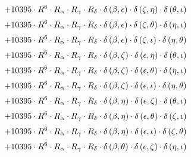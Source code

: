\begin{subequations}
\begin{gather}
 \\[0.2em] \notag 		 + 10395 \cdot R^{6} \cdot R_{\alpha{}} \cdot R_{\gamma{}} \cdot R_{\delta{}} \cdot \delta{}\left(\beta{}, \epsilon{}\right) \cdot \delta{}\left(\zeta{}, \eta{}\right) \cdot \delta{}\left(\theta{}, \iota{}\right) 
 \\[0.2em] \notag 		 + 10395 \cdot R^{6} \cdot R_{\alpha{}} \cdot R_{\gamma{}} \cdot R_{\delta{}} \cdot \delta{}\left(\beta{}, \epsilon{}\right) \cdot \delta{}\left(\zeta{}, \theta{}\right) \cdot \delta{}\left(\eta{}, \iota{}\right) 
 \\[0.2em] \notag 		 + 10395 \cdot R^{6} \cdot R_{\alpha{}} \cdot R_{\gamma{}} \cdot R_{\delta{}} \cdot \delta{}\left(\beta{}, \epsilon{}\right) \cdot \delta{}\left(\zeta{}, \iota{}\right) \cdot \delta{}\left(\eta{}, \theta{}\right) 
 \\[0.2em] \notag 		 + 10395 \cdot R^{6} \cdot R_{\alpha{}} \cdot R_{\gamma{}} \cdot R_{\delta{}} \cdot \delta{}\left(\beta{}, \zeta{}\right) \cdot \delta{}\left(\epsilon{}, \eta{}\right) \cdot \delta{}\left(\theta{}, \iota{}\right) 
 \\[0.2em] \notag 		 + 10395 \cdot R^{6} \cdot R_{\alpha{}} \cdot R_{\gamma{}} \cdot R_{\delta{}} \cdot \delta{}\left(\beta{}, \zeta{}\right) \cdot \delta{}\left(\epsilon{}, \theta{}\right) \cdot \delta{}\left(\eta{}, \iota{}\right) 
 \\[0.2em] \notag 		 + 10395 \cdot R^{6} \cdot R_{\alpha{}} \cdot R_{\gamma{}} \cdot R_{\delta{}} \cdot \delta{}\left(\beta{}, \zeta{}\right) \cdot \delta{}\left(\epsilon{}, \iota{}\right) \cdot \delta{}\left(\eta{}, \theta{}\right) 
 \\[0.2em] \notag 		 + 10395 \cdot R^{6} \cdot R_{\alpha{}} \cdot R_{\gamma{}} \cdot R_{\delta{}} \cdot \delta{}\left(\beta{}, \eta{}\right) \cdot \delta{}\left(\epsilon{}, \zeta{}\right) \cdot \delta{}\left(\theta{}, \iota{}\right) 
 \\[0.2em] \notag 		 + 10395 \cdot R^{6} \cdot R_{\alpha{}} \cdot R_{\gamma{}} \cdot R_{\delta{}} \cdot \delta{}\left(\beta{}, \eta{}\right) \cdot \delta{}\left(\epsilon{}, \theta{}\right) \cdot \delta{}\left(\zeta{}, \iota{}\right) 
 \\[0.2em] \notag 		 + 10395 \cdot R^{6} \cdot R_{\alpha{}} \cdot R_{\gamma{}} \cdot R_{\delta{}} \cdot \delta{}\left(\beta{}, \eta{}\right) \cdot \delta{}\left(\epsilon{}, \iota{}\right) \cdot \delta{}\left(\zeta{}, \theta{}\right) 
 \\[0.2em] \notag 		 + 10395 \cdot R^{6} \cdot R_{\alpha{}} \cdot R_{\gamma{}} \cdot R_{\delta{}} \cdot \delta{}\left(\beta{}, \theta{}\right) \cdot \delta{}\left(\epsilon{}, \zeta{}\right) \cdot \delta{}\left(\eta{}, \iota{}\right) 

\end{gather}
\end{subequations}
